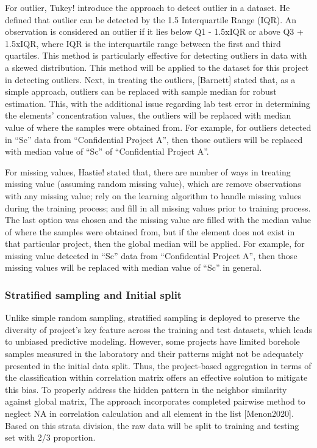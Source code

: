 \documentclass[11pt,a4paper,]{article}
\begin{document}
For outlier, Tukey! introduce the approach to detect outlier in a dataset. He defined that outlier can be detected by the 1.5 Interquartile Range (IQR). An observation is considered an outlier if it lies below Q1 - 1.5xIQR or above Q3 + 1.5xIQR, where IQR is the interquartile range between the first and third quartiles. This method is particularly effective for detecting outliers in data with a skewed distribution. This method will be applied to the dataset for this project in detecting outliers. Next, in treating the outliers, {[}Barnett{]} stated that, as a simple approach, outliers can be replaced with sample median for robust estimation. This, with the additional issue regarding lab test error in determining the elements' concentration values, the outliers will be replaced with median value of where the samples were obtained from. For example, for outliers detected in ``Sc'' data from ``Confidential Project A'', then those outliers will be replaced with median value of ``Sc'' of ``Confidential Project A''.

For missing values, Hastie! stated that, there are number of ways in treating missing value (assuming random missing value), which are remove observations with any missing value; rely on the learning algorithm to handle missing values during the training process; and fill in all missing values prior to training process. The last option was chosen and the missing value are filled with the median value of where the samples were obtained from, but if the element does not exist in that particular project, then the global median will be applied. For example, for missing value detected in ``Sc'' data from ``Confidential Project A'', then those missing values will be replaced with median value of ``Sc'' in general.

\subsubsection{Stratified sampling and Initial split}\label{stratified-sampling-and-initial-split}

Unlike simple random sampling, stratified sampling is deployed to preserve the diversity of project's key feature across the training and test datasets, which leads to unbiased predictive modeling. However, some projects have limited borehole samples measured in the laboratory and their patterns might not be adequately presented in the initial data split. Thus, the project-based aggregation in terms of the classification within correlation matrix offers an effective solution to mitigate this bias. To properly address the hidden pattern in the neighbor similarity against global matrix, The approach incorporates completed pairwise method to neglect NA in correlation calculation and all element in the list {[}Menon2020{]}. Based on this strata division, the raw data will be split to training and testing set with 2/3 proportion.
\end{document}
